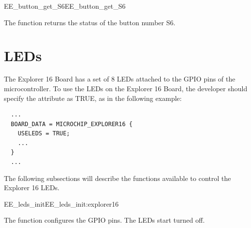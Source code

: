 \begin{function_nopb2}{EE\_button\_get\_S6}{EE_button_get_S6}
  
  \begin{fundescription}
    The function returns the status of the button number S6.
  \end{fundescription}
  
  
  \begin{funreturn}
  \end{funreturn}
  
\end{function_nopb2}





\section{LEDs}

The Explorer 16 Board has a set of 8 LEDs attached to the GPIO pins of the
microcontroller. To use the LEDs on the Explorer 16 Board, the
developer should specify the  attribute as TRUE, as in
the following example:

\begin{lstlisting}
  ...
  BOARD_DATA = MICROCHIP_EXPLORER16 {
    USELEDS = TRUE;
    ...
  }
  ...
\end{lstlisting}

The following subsections will describe the functions available to
control the Explorer 16 LEDs.

\begin{function_nopb2}{EE\_leds\_init}{EE_leds_init:explorer16}
  
  \begin{fundescription}
    The function configures the GPIO pins. The LEDs start turned off.
  \end{fundescription}
  
  
  
\end{function_nopb2}

